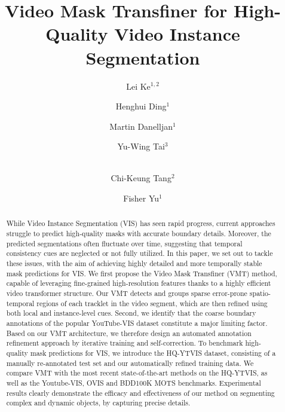\documentclass[runningheads]{llncs}
\begin{document}
\pagestyle{headings}
\mainmatter
\def\ECCVSubNumber{939}  

\title{Video Mask Transfiner for High-Quality Video Instance Segmentation}

\begin{comment}
\titlerunning{ECCV-22 submission ID \ECCVSubNumber} 
\authorrunning{ECCV-22 submission ID \ECCVSubNumber} 
\author{Anonymous ECCV submission}
\institute{Paper ID \ECCVSubNumber}
\end{comment}




\author{
 Lei Ke$^{1,2}$ \and Henghui Ding$^1$ \and Martin Danelljan$^1$ \and Yu-Wing Tai$^3$ \and \\ Chi-Keung Tang$^2$ \and Fisher Yu$^1$\\
 }



\maketitle

\begin{abstract}
While Video Instance Segmentation (VIS) has seen rapid progress, current approaches struggle to predict high-quality masks with accurate boundary details. Moreover, the predicted segmentations often fluctuate over time, suggesting that temporal consistency cues are neglected or not fully utilized. In this paper, we set out to tackle these issues, with the aim of achieving highly detailed and more temporally stable mask predictions for VIS. We first propose the Video Mask Transfiner (VMT) method, capable of leveraging fine-grained high-resolution features thanks to a highly efficient video transformer structure. Our VMT detects and groups sparse error-prone spatio-temporal regions of each tracklet in the video segment, which are then refined using both local and instance-level cues. Second, we identify that the coarse boundary annotations of the popular YouTube-VIS dataset constitute a major limiting factor. Based on our VMT architecture, we therefore design an automated annotation refinement approach by iterative training and self-correction. To benchmark high-quality mask predictions for VIS, we introduce the HQ-YTVIS dataset, consisting of a manually re-annotated test set and our automatically refined training data. We compare VMT with the most recent state-of-the-art methods on the HQ-YTVIS, as well as the Youtube-VIS, OVIS and BDD100K MOTS benchmarks. Experimental results clearly demonstrate the efficacy and effectiveness of our method on segmenting complex and dynamic objects, by capturing precise details.

\end{abstract}
\end{document}
